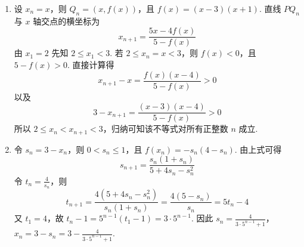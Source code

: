 \begin{solution}
\begin{enumerate}
\item 设 \(x_n=x\)，则 \(Q_n=(x,f(x))\)，且
\(f(x)=(x-3)(x+1)\). 直线 \(PQ_n\) 与 \(x\) 轴交点的横坐标为
\[
x_{n+1}=\frac{5x-4f(x)}{5-f(x)}
\]
由 \(x_1=2\) 先知 \(2\leqslant x_1<3\). 若 \(2\leqslant x_n=x<3\)，则 \(f(x)<0\)，且 \(5-f(x)>0\). 直接计算得
\[
x_{n+1}-x=\frac{f(x)(x-4)}{5-f(x)}>0
\]
以及
\[
3-x_{n+1}=\frac{(x-3)(x-4)}{5-f(x)}>0
\]
所以 \(2\leqslant x_n<x_{n+1}<3\)，归纳可知该不等式对所有正整数 \(n\) 成立.
\item 令 \(s_n=3-x_n\)，则 \(0<s_n\leqslant1\)，且 \(f(x_n)=-s_n(4-s_n)\). 由上式可得
\[
s_{n+1}=\frac{s_n(1+s_n)}{5+4s_n-s_n^2}
\]
令 \(t_n=\frac{4}{s_n}\)，则
\[
t_{n+1}=\frac{4(5+4s_n-s_n^2)}{s_n(1+s_n)}
 =\frac{4(5-s_n)}{s_n}=5t_n-4
\]
又 \(t_1=4\)，故 \(t_n-1=5^{n-1}(t_1-1)=3\cdot5^{n-1}\). 因此
\(s_n=\frac{4}{3\cdot5^{n-1}+1}\)，\(x_n=3-s_n=3-\frac{4}{3\cdot5^{n-1}+1}\).
\end{enumerate}
\end{solution}
